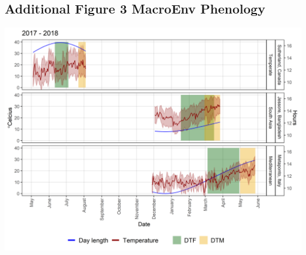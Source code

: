 \documentclass[
]{article}
\begin{document}
\hypertarget{additional-figure-3-macroenv-phenology}{%
\subsection{Additional Figure 3 MacroEnv
Phenology}\label{additional-figure-3-macroenv-phenology}}

\includegraphics{Additional/Additional_Figure_03.png}
\end{document}
